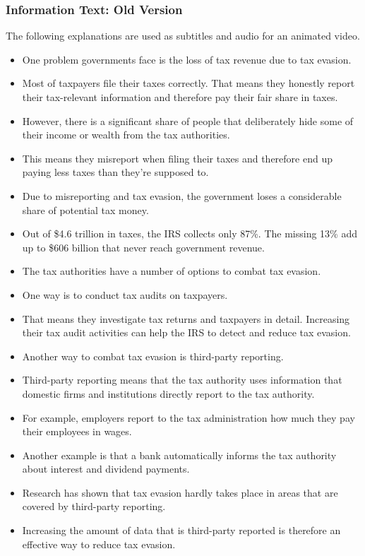 \documentclass[11pt]{article}
\begin{document}
\subsubsection*{Information Text: Old Version}
The following explanations are used as subtitles and audio for an animated video.
\begin{itemize}
\item One problem governments face is the loss of tax revenue due to tax evasion.
\item Most of taxpayers file their taxes correctly. That means they honestly report their tax-relevant information and therefore pay their fair share in taxes. 
\item However, there is a significant share of people that deliberately hide some of their income or wealth from the tax authorities. 
\item This means they misreport when filing their taxes and therefore end up paying less taxes than they're supposed to. 
\item Due to misreporting and tax evasion, the government loses a considerable share of potential tax money.
\item Out of \$4.6 trillion in taxes, the IRS collects only 87\%. The missing 13\% add up to \$606 billion that never reach government revenue. 
\item The tax authorities have a number of options to combat tax evasion. 
\item One way is to conduct tax audits on taxpayers. 
\item That means they investigate tax returns and taxpayers in detail. Increasing their tax audit activities can help the IRS to detect and reduce tax evasion. 
\item Another way to combat tax evasion is third-party reporting. 
\item Third-party reporting means that the tax authority uses information that domestic firms and institutions directly report to the tax authority. 
\item For example, employers report to the tax administration how much they pay their employees in wages. 
\item Another example is that a bank automatically informs the tax authority about interest and dividend payments. 
\item Research has shown that tax evasion hardly takes place in areas that are covered by third-party reporting. 
\item Increasing the amount of data that is third-party reported is therefore an effective way to reduce tax evasion. 

\end{itemize}
\end{document}
